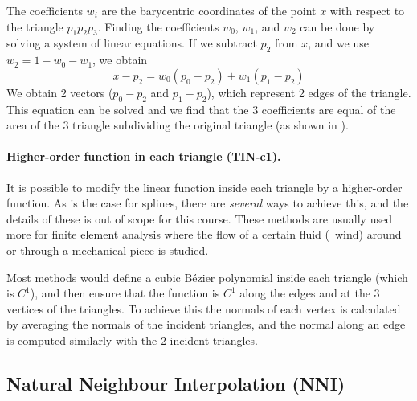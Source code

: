 The coefficients $w_i$ are the barycentric coordinates of the point $x$ with respect to the triangle $p_1p_2p_3$.
Finding the coefficients $w_0$, $w_1$, and $w_2$ can be done by solving a system of linear equations.
If we subtract $p_2$ from $x$, and we use $w_2 = 1 - w_0 - w_1$, we obtain
\begin{equation}
  x - p_2 = w_0(p_0-p_2) + w_1(p_1 - p_2)
\end{equation}
We obtain 2 vectors ($p_0-p_2$ and $p_1-p_2$), which represent 2 edges of the triangle.
This equation can be solved and we find that the 3 coefficients are equal of the area of the 3 triangle subdividing the original triangle (as shown in ).


\paragraph{Higher-order function in each triangle (\textbf{TIN-c1}).}
It is possible to modify the linear function inside each triangle by a higher-order function.
As is the case for splines, there are \emph{several} ways to achieve this, and the details of these is out of scope for this course.
These methods are usually used more for finite element analysis where the flow of a certain fluid (\eg\ wind) around or through a mechanical piece is studied.

%

Most methods would define a cubic Bézier polynomial inside each triangle (which is $C^1$), and then ensure that the function is $C^1$ along the edges and at the 3 vertices of the triangles.
To achieve this the normals of each vertex is calculated by averaging the normals of the incident triangles, and the normal along an edge is computed similarly with the 2 incident triangles.



\subsection{Natural Neighbour Interpolation (\textbf{NNI})}%


